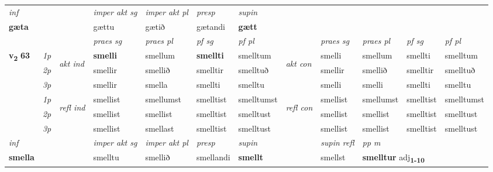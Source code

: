 \begin{longtable}[l]{X>{\footnotesize\itshape}llXXXXlXXXX}
   {\textit{inf}} & &  & \textit{imper akt sg} & \textit{imper akt pl}   & \textit{presp} & \textit{supin}   \\*
  {\textbf{gæta}} & && gættu  & gætið   & gætandi &  \textbf{gætt}   \\*

\midrule

 & &   & \textit{praes sg}  & \textit{praes pl}    & \textit{ pf sg} & \textit{pf pl} & & \textit{praes sg}  & \textit{praes pl}    & \textit{pf sg} & \textit{pf pl }  \\ \cmidrule{4-7} \cmidrule{9-12}
 \multirow{2}{*}{{{\textbf{v{\textsubscript{2}}} \Large{\textbf{63}}}}}  & 1p & \multirow{3}{*}{\begin{turn}{90}\textit{akt ind}\end{turn}} & \textbf{smelli} & smellum & \textbf{smellti} & smelltum & \multirow{3}{*}{\begin{turn}{90}\textit{akt con}\end{turn}} &smelli & smellum & smellti & smelltum\\*
 & 2p &  &  smellir  & smellið & smelltir & smelltuð & & smellir & smellið & smelltir & smelltuð \\*
 & 3p &  & smellir & smella & smellti & smelltu & & smelli & smelli& smellti & smelltu \\*
\cmidrule{4-7} \cmidrule{9-12}
 & 1p & \multirow{3}{*}{\begin{turn}{90}\textit{refl ind}\end{turn}}  & smellist & smellumst & smelltist & smelltumst & \multirow{3}{*}{\begin{turn}{90}\textit{refl con}\end{turn}}  &smellist & smellumst & smelltist & smelltumst \\*
 & 2p &  & smellist & smellist & smelltist & smelltust & &smellist & smellist & smelltist & smelltust \\*
 & 3p  & & smellist & smellast & smelltist & smelltust & & smellist & smellist& smelltist & smelltust \\*
\cmidrule{4-7} \cmidrule{9-12}

   {\textit{inf}} & &  & \textit{imper akt sg} & \textit{imper akt pl}   & \textit{presp} & \textit{supin} && \textit{supin refl} & \textit{pp m} \\*
  {\textbf{smella}} & && smelltu  & smellið   & smellandi &  \textbf{smellt} && smellst & \multicolumn{2}{l}{\textbf{smelltur} adj\textbf{\textsubscript{1-10}}} \\*


\end{longtable}
